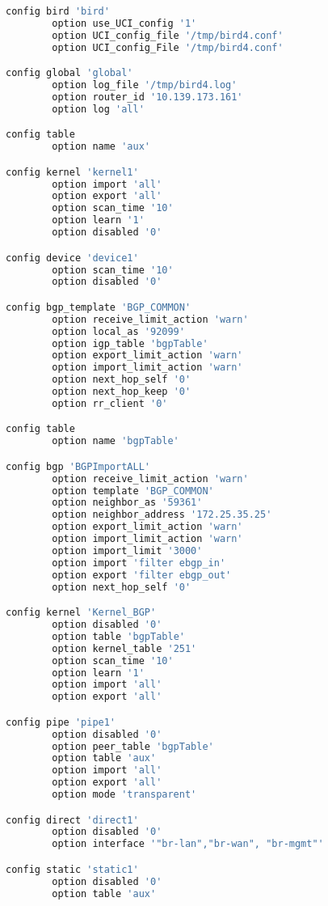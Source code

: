 \begin{lstlisting}[language=bash,caption={UCI Configuration}]
config bird 'bird'
        option use_UCI_config '1'
        option UCI_config_file '/tmp/bird4.conf'
        option UCI_config_File '/tmp/bird4.conf'

config global 'global'
        option log_file '/tmp/bird4.log'
        option router_id '10.139.173.161'
        option log 'all'

config table
        option name 'aux'

config kernel 'kernel1'
        option import 'all'
        option export 'all'
        option scan_time '10'
        option learn '1'
        option disabled '0'

config device 'device1'
        option scan_time '10'
        option disabled '0'

config bgp_template 'BGP_COMMON'
        option receive_limit_action 'warn'
        option local_as '92099'
        option igp_table 'bgpTable'
        option export_limit_action 'warn'
        option import_limit_action 'warn'
        option next_hop_self '0'
        option next_hop_keep '0'
        option rr_client '0'

config table
        option name 'bgpTable'

config bgp 'BGPImportALL'
        option receive_limit_action 'warn'
        option template 'BGP_COMMON'
        option neighbor_as '59361'
        option neighbor_address '172.25.35.25'
        option export_limit_action 'warn'
        option import_limit_action 'warn'
        option import_limit '3000'
        option import 'filter ebgp_in'
        option export 'filter ebgp_out'
        option next_hop_self '0'

config kernel 'Kernel_BGP'
        option disabled '0'
        option table 'bgpTable'
        option kernel_table '251'
        option scan_time '10'
        option learn '1'
        option import 'all'
        option export 'all'

config pipe 'pipe1'
        option disabled '0'
        option peer_table 'bgpTable'
        option table 'aux'
        option import 'all'
        option export 'all'
        option mode 'transparent'

config direct 'direct1'
        option disabled '0'
        option interface '"br-lan","br-wan", "br-mgmt"'

config static 'static1'
        option disabled '0'
        option table 'aux'
\end{lstlisting}